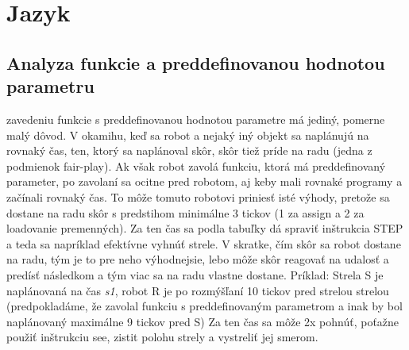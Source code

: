 \section{Jazyk}
\subsection{Analyza funkcie a preddefinovanou hodnotou parametru}
zavedeniu funkcie s preddefinovanou hodnotou parametre má jediný, pomerne malý dôvod. V okamihu, keď sa robot a nejaký iný objekt sa naplánujú na rovnaký čas, ten, ktorý sa naplánoval skôr, skôr tiež príde na radu (jedna z podmienok fair-play). Ak však robot zavolá funkciu, ktorá má preddefinovaný parameter, po zavolaní sa ocitne pred robotom, aj keby mali rovnaké programy a začínali rovnaký čas. To môže tomuto robotovi priniesť isté výhody, pretože sa dostane na radu skôr s predstihom minimálne 3 tickov (1 za assign a 2 za loadovanie premenných). Za ten čas sa podla tabuľky dá spraviť inštrukcia STEP a teda sa napríklad efektívne vyhnúť strele. V skratke, čím skôr sa robot dostane na radu, tým je to pre neho výhodnejsie, lebo môže skôr reagovať na udalosť a predísť následkom a tým viac sa na radu vlastne dostane. Príklad: Strela S je naplánovaná na čas {\it s1}, robot R je po rozmýšľaní 10 tickov pred strelou strelou (predpokladáme, že zavolal funkciu s preddefinovaným parametrom a inak by bol naplánovaný maximálne 9 tickov pred S) Za ten čas sa môže 2x pohnúť, poťažne použiť inštrukciu see, zistit polohu strely a vystreliť jej smerom.
